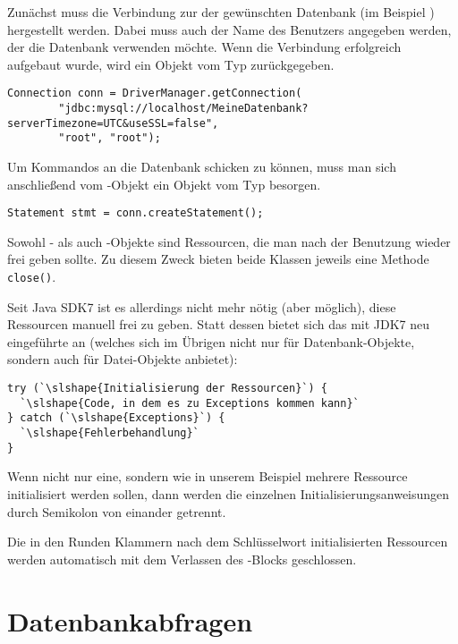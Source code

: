 Zunächst muss die Verbindung zur der gewünschten Datenbank (im Beispiel
) hergestellt werden. Dabei muss auch der Name des
Benutzers angegeben werden, der die Datenbank verwenden möchte. Wenn die
Verbindung erfolgreich aufgebaut wurde, wird ein Objekt vom Typ
 zurückgegeben.

\begin{lstlisting}
Connection conn = DriverManager.getConnection(
        "jdbc:mysql://localhost/MeineDatenbank?serverTimezone=UTC&useSSL=false",
        "root", "root");
\end{lstlisting}

Um Kommandos an die Datenbank schicken zu können, muss man sich anschließend vom
-Objekt ein Objekt vom Typ  besorgen.

\begin{lstlisting}
Statement stmt = conn.createStatement();
\end{lstlisting}

Sowohl - als auch -Objekte sind
Ressourcen, die man nach der Benutzung wieder frei geben sollte. Zu diesem Zweck
bieten beide Klassen jeweils eine Methode \lstinline|close()|.

Seit Java SDK7 ist es allerdings nicht mehr nötig (aber möglich), diese
Ressourcen manuell frei zu geben. Statt dessen bietet sich das mit JDK7 neu
eingeführte  an (welches sich im Übrigen nicht
nur für Datenbank-Objekte, sondern auch für Datei-Objekte anbietet):

\begin{lstlisting}
try (`\slshape{Initialisierung der Ressourcen}`) {
  `\slshape{Code, in dem es zu Exceptions kommen kann}`
} catch (`\slshape{Exceptions}`) {
  `\slshape{Fehlerbehandlung}`
}
\end{lstlisting}

Wenn nicht nur eine, sondern wie in unserem Beispiel mehrere Ressource
initialisiert werden sollen, dann werden die einzelnen
Initialisierungsanweisungen durch Semikolon von einander getrennt.

Die in den Runden Klammern nach dem Schlüsselwort 
initialisierten Ressourcen werden automatisch mit dem Verlassen des
-Blocks geschlossen.

\section{Datenbankabfragen}

